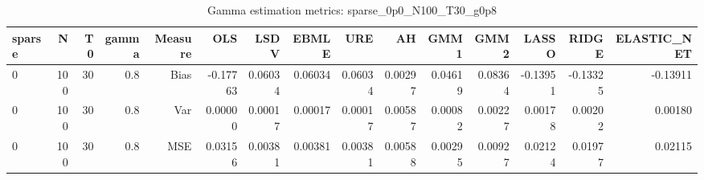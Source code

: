\begin{table}[!htbp]\centering
\caption{Gamma estimation metrics: sparse_0p0_N100_T30_g0p8}
\label{tab:table1_sparse_0p0_N100_T30_g0p8}
\begin{tabular}{lrrrrrrrrrrrrrr}
\hline
sparse & N & T0 & gamma & Measure & OLS & LSDV & EBMLE & URE & AH & GMM1 & GMM2 & LASSO & RIDGE & ELASTIC_NET \\
\hline
0 & 100 & 30 & 0.8 & Bias & -0.17763 & 0.06034 & 0.06034 & 0.06034 & 0.00297 & 0.04619 & 0.08364 & -0.13951 & -0.13325 & -0.13911 \\
0 & 100 & 30 & 0.8 & Var & 0.00000 & 0.00017 & 0.00017 & 0.00017 & 0.00587 & 0.00082 & 0.00227 & 0.00178 & 0.00202 & 0.00180 \\
0 & 100 & 30 & 0.8 & MSE & 0.03156 & 0.00381 & 0.00381 & 0.00381 & 0.00588 & 0.00295 & 0.00927 & 0.02124 & 0.01977 & 0.02115 \\
\hline
\end{tabular}
\end{table}

